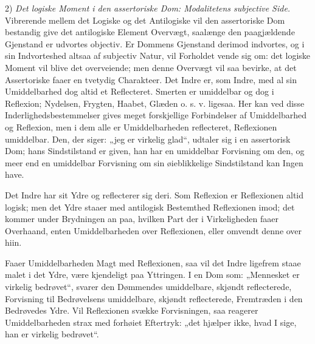 \documentclass[12pt]{book}
\newcommand{\opage}[1]{\marginnote{\footnotesize\textit{[#1]}}}
\begin{document}
2) \emph{Det logiske Moment i den assertoriske Dom:
Modalitetens subjective Side.} Vibrerende mellem det
Logiske og det Antilogiske vil den assertoriske Dom bestandig
give det antilogiske Element Overvægt, saalænge den paagjældende
Gjenstand er udvortes objectiv. Er Dommens Gjenstand
derimod indvortes, og i sin Indvorteshed altsaa af subjectiv
Natur, vil Forholdet vende sig om: det logiske Moment
vil blive det overveiende; men denne Overvægt vil saa bevirke,
at det Assertoriske faaer en tvetydig Charakteer. Det Indre
er, som Indre, med al sin Umiddelbarhed dog altid et
Re\opage{192}flecteret. Smerten er umiddelbar og dog i Reflexion; Nydelsen,
Frygten, Haabet, Glæden o. s. v. ligesaa. Her kan
ved disse Inderlighedsbestemmelser gives meget forskjellige Forbindelser
af Umiddelbarhed og Reflexion, men i dem alle er
Umiddelbarheden reflecteret, Reflexionen umiddelbar. Den,
der siger: „jeg er virkelig glad“, udtaler sig i en assertorisk
Dom; hans Sindstilstand er given, han har en umiddelbar
Forvisning om den, og meer end en umiddelbar Forvisning
om sin øieblikkelige Sindstilstand kan Ingen have.

Det Indre har sit Ydre og reflecterer sig deri. Som
Reflexion er Reflexionen altid logisk; men det Ydre staaer
med antilogisk Bestemthed Reflexionen imod; det kommer under
Brydningen an paa, hvilken Part der i Virkeligheden faaer
Overhaand, enten Umiddelbarheden over Reflexionen, eller omvendt
denne over hiin.

Faaer Umiddelbarheden Magt med Reflexionen, saa vil
det Indre ligefrem staae malet i det Ydre, være kjendeligt
paa Yttringen. I en Dom som: „Mennesket er virkelig bedrøvet“,
svarer den Dømmendes umiddelbare, skjøndt reflecterede,
Forvisning til Bedrøvelsens umiddelbare, skjøndt reflecterede,
Fremtræden i den Bedrøvedes Ydre. Vil Reflexionen svække
Forvisningen, saa reagerer Umiddelbarheden strax med forhøiet
Eftertryk: „det hjælper ikke, hvad I sige, han er
virkelig bedrøvet“.
\end{document}
